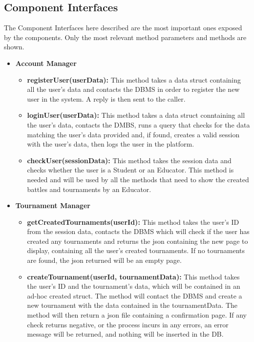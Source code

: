 \documentclass{article}
\begin{document}
{\subsection{Component Interfaces}
The Component Interfaces here described are the most important ones exposed by the components.
Only the most relevant method parameters and methods are shown.
\begin{itemize}
\item \textbf{Account Manager}
    \begin{itemize}
        \item \textbf{registerUser(userData):} This method takes a data struct containing all the user's data and contacts the DBMS in order to 
        register the new user in the system. A reply is then sent to the caller.
        \item \textbf{loginUser(userData):} This method takes a data struct conntaining all the user's data, contacts the DMBS, runs a query that checks
        for the data matching the user's data provided and, if found, creates a valid session with the user's data, then logs the user in the platform.
        \item \textbf{checkUser(sessionData):} This method takes the session data and checks whether the user is a Student or an Educator.
        This method is needed and will be used by all the methods that need to show the created battles and tournaments by an Educator.
    \end{itemize}
    \item \textbf{Tournament Manager}
    \begin{itemize}
        \item \textbf{getCreatedTournaments(userId):} This method takes the user's ID from the session data, contacts the DBMS which will check 
        if the user has created any tournaments and returns the json containing the new page to display, containing all the user's created tournaments.
        If no tournaments are found, the json returned will be an empty page.
        \item \textbf{createTournament(userId, tournamentData):} This method takes the user's ID and the tournament's data, which will be contained in an ad-hoc
        created struct. The method will contact the DBMS and create a new tournament with the data contained in the tournamentData. 
        The method will then return a json file containing a confirmation page.
        If any check returns negative, or the process incurs in any errors, an error message will be returned, and nothing will be inserted in the DB.

\end{itemize}
\end{itemize}}
\end{document}
